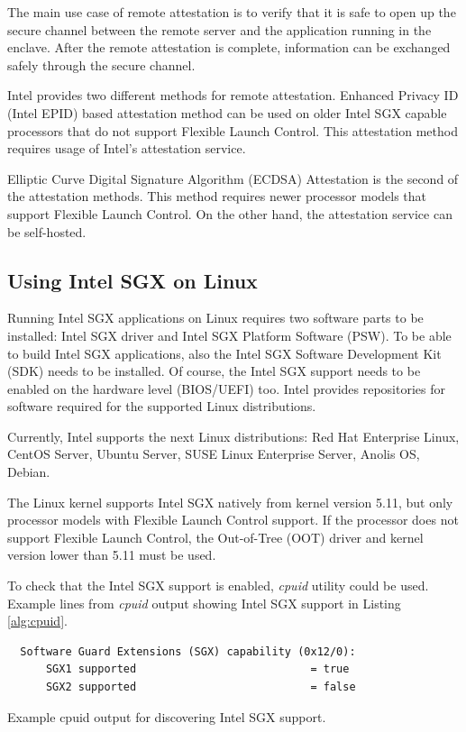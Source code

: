The main use case of remote attestation is to verify that it is safe to open up the secure channel between the remote server and the application running in the enclave. After the remote attestation is complete, information can be exchanged safely through the secure channel.

Intel provides two different methods for remote attestation. Enhanced Privacy ID (Intel EPID) based attestation method can be used on older Intel SGX capable processors that do not support Flexible Launch Control. This attestation method requires usage of Intel's attestation service.

Elliptic Curve Digital Signature Algorithm (ECDSA) Attestation is the second of the attestation methods. This method requires newer processor models that support Flexible Launch Control. On the other hand, the attestation service can be self-hosted.

\subsection{Using Intel SGX on Linux}\label{usingsgxonlinux}

Running Intel SGX applications on Linux requires two software parts to be installed: Intel SGX driver and Intel SGX Platform Software (PSW). 
To be able to build Intel SGX applications, also the Intel SGX Software Development Kit (SDK) needs to be installed. Of course, the Intel SGX support needs to be enabled on the hardware level (BIOS/UEFI) too. Intel provides repositories for software required for the supported Linux distributions.

Currently, Intel supports the next Linux distributions: Red Hat Enterprise Linux, CentOS Server, Ubuntu Server, SUSE Linux Enterprise Server, Anolis OS, Debian.

The Linux kernel supports Intel SGX natively from kernel version 5.11, but only processor models with Flexible Launch Control support. If the processor does not support Flexible Launch Control, the Out-of-Tree (OOT) driver and kernel version lower than 5.11 must be used.

To check that the Intel SGX support is enabled, \textit{cpuid} utility could be used. Example lines from \textit{cpuid} output showing Intel SGX support in Listing \ref{alg:cpuid}.

\begin{algorithm}
\begin{verbatim}
  Software Guard Extensions (SGX) capability (0x12/0):
      SGX1 supported                           = true
      SGX2 supported                           = false
\end{verbatim}
\caption{Example cpuid output for discovering Intel SGX support.\label{alg:cpuid}}
\end{algorithm}

